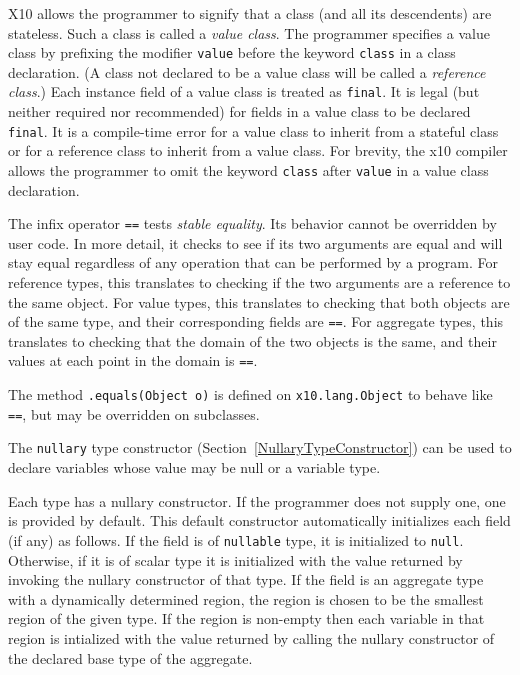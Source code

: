 \documentclass{article}
\def\ccfont{\sf}
\def\x10{{\ccfont x10}}
\def\X10{{\ccfont X10}}
\begin{document}
\X10{} allows the programmer to signify that a class (and all its
descendents) are stateless. Such a class is called a {\em value
class}.  The programmer specifies a value class by prefixing the
modifier {\tt value} before the keyword {\tt class} in a class
declaration.  (A class not declared to be a value class will be called
a {\em reference class}.)  Each instance field of a value class is
treated as {\tt final}. It is legal (but neither required nor
recommended) for fields in a value class to be declared {\tt final}.
It is a compile-time error for a value class to inherit from a
stateful class or for a reference class to inherit from a value class.
For brevity, the \x10{} compiler allows the programmer to omit the
keyword {\tt class} after {\tt value} in a value class declaration.

The infix operator {\tt ==} tests {\em stable equality}. Its behavior
cannot be overridden by user code.  In more detail, it checks to see
if its two arguments are equal and will stay equal regardless of any
operation that can be performed by a program. For reference types,
this translates to checking if the two arguments are a reference to
the same object. For value types, this translates to checking that
both objects are of the same type, and their corresponding fields are
{\tt ==}. For aggregate types, this translates to checking that the
domain of the two objects is the same, and their values at each point
in the domain is {\tt ==}.

The method {\tt .equals(Object o)} is defined on {\tt x10.lang.Object}
to behave like {\tt ==}, but may be overridden on subclasses.



The {\tt nullary} type constructor
(Section~\ref{NullaryTypeConstructor}) can be used to declare
variables whose value may be null or a variable type.

Each type has a nullary constructor. If the programmer does not supply
one, one is provided by default. This default constructor
automatically initializes each field (if any) as follows. If the field
is of {\tt nullable} type, it is initialized to {\tt null}. Otherwise,
if it is of scalar type it is initialized with the value returned by
invoking the nullary constructor of that type.  If the field is an
aggregate type with a dynamically determined region, the region is
chosen to be the smallest region of the given type. If the region is
non-empty then each variable in that region is intialized with the
value returned by calling the nullary constructor of the declared base
type of the aggregate.
\end{document}
